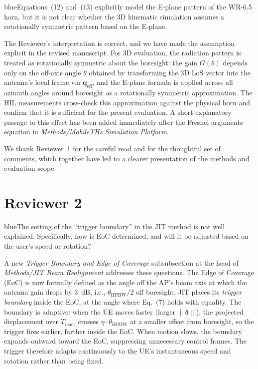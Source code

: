 \documentclass{article}
\newcommand{\blue}[1]{\begin{color}{blue}#1\end{color}}
\begin{document}
\begin{tcbremark}
{\selectfont
\blue{Equations~(12) and~(13) explicitly model the E-plane pattern of the WR-6.5 horn, but it is not clear whether the 3D kinematic simulation assumes a rotationally symmetric pattern based on the E-plane.}
}
\end{tcbremark}

\noindent The Reviewer's interpretation is correct, and we have made the assumption explicit in the revised manuscript. For 3D evaluation, the radiation pattern is treated as rotationally symmetric about the boresight: the gain $G(\theta)$ depends only on the off-axis angle $\theta$ obtained by transforming the 3D LoS vector into the antenna's local frame via $\mathbf{q}_{\text{eff}}$, and the E-plane formula is applied across all azimuth angles around boresight as a rotationally symmetric approximation. The HIL measurements cross-check this approximation against the physical horn and confirm that it is sufficient for the present evaluation. A short explanatory passage to this effect has been added immediately after the Fresnel-arguments equation in \emph{Methods/MobileTHz Simulation Platform}.

\bigskip
\noindent We thank Reviewer~1 for the careful read and for the thoughtful set of comments, which together have led to a clearer presentation of the methods and evaluation scope.

\newpage

\section*{Reviewer 2}

\begin{tcbremark}
{\selectfont
\blue{The setting of the ``trigger boundary'' in the JIT method is not well explained. Specifically, how is EoC determined, and will it be adjusted based on the user's speed or rotation?}
}
\end{tcbremark}

\noindent A new \emph{Trigger Boundary and Edge of Coverage} subsubsection at the head of \emph{Methods/JIT Beam Realignment} addresses these questions. The Edge of Coverage (EoC) is now formally defined as the angle off the AP's beam axis at which the antenna gain drops by \SI{3}{\deci\bel}, i.e., $\theta_{\text{HPBW}}/2$ off boresight. JIT places its \emph{trigger boundary} inside the EoC, at the angle where Eq.~(7) holds with equality. The boundary is adaptive: when the UE moves faster (larger $\|\dot{\boldsymbol\delta}\|$), the projected displacement over $T_{\text{react}}$ crosses $\eta \cdot \theta_{\text{HPBW}}$ at a smaller offset from boresight, so the trigger fires earlier, farther inside the EoC. When motion slows, the boundary expands outward toward the EoC, suppressing unnecessary control frames. The trigger therefore adapts continuously to the UE's instantaneous speed and rotation rather than being fixed.
\end{document}
